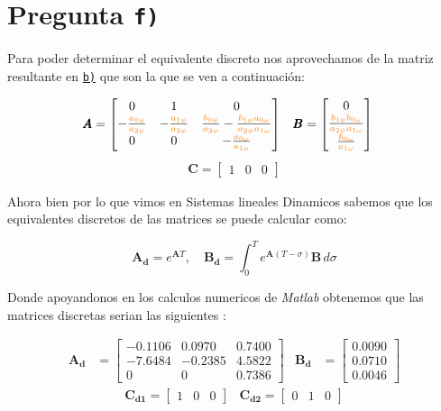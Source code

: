\section{Pregunta \texttt{f)}}\label{pregunta-f}

Para poder determinar el equivalente discreto nos aprovechamos de la matriz resultante en \hyperref[pregunta-b]{\texttt{b)}} que son la que se ven a continuación:

\begin{align}
    \pmb{A} &= \begin{bmatrix}
        0 & 1 & 0 \\
        -\frac{\nara{a_{0\psi}}}{\nara{a_{2\psi}}}   & -\frac{\nara{a_{1\psi}}}{\nara{a_{2\psi}}} & \frac{\nara{b_{0\psi}}}{\nara{a_{2\psi}}} - \frac{\nara{b_{1\psi}}\nara{a_{0\omega}}}{\nara{a_{2\psi}}\nara{a_{1\omega}}} \\
        0 & 0 & -\frac{\nara{a_{0\omega}}}{\nara{a_{1\omega}}}
    \end{bmatrix} &
    \pmb{B} &= \begin{bmatrix}
        0 \\
        \frac{\nara{b_{1\psi}}\nara{b_{0\omega}}}{\nara{a_{2\psi}}\nara{a_{1\omega}}} \\
        \frac{\nara{b_{0\omega}}}{\nara{a_{1\omega}}}
    \end{bmatrix}
  \end{align}
  \begin{align}
    \pmb{C} = \begin{bmatrix}
      1 & 0 & 0
    \end{bmatrix}
  \end{align}

Ahora bien por lo que vimos en Sistemas lineales Dinamicos sabemos que los equivalentes discretos de las matrices se puede calcular como:

\[
\mathbf{A_d}= e^{\mathbf{A}T} ,\quad \mathbf{B_d}= \int_{0}^{T} e^{\mathbf{A}(T-\sigma)}\mathbf{B}  \,d\sigma 
\]

Donde apoyandonos en los calculos numericos de \textit{Matlab} obtenemos que las matrices discretas serian las siguientes :


\begin{align}
    \mathbf{A_d} &= \begin{bmatrix}
        -0.1106 & 0.0970 & 0.7400 \\
        -7.6484 &  -0.2385 & 4.5822 \\
        0 & 0 & 0.7386
    \end{bmatrix} &
    \mathbf{B_d} &= \begin{bmatrix}
        0.0090 \\
        0.0710 \\
        0.0046
    \end{bmatrix}
  \end{align}
  \begin{align}
    \pmb{C_{d1}} = \begin{bmatrix}
      1 & 0 & 0
    \end{bmatrix}&
    \pmb{C_{d2}} = \begin{bmatrix}
      0 & 1 & 0
    \end{bmatrix}
\end{align}

